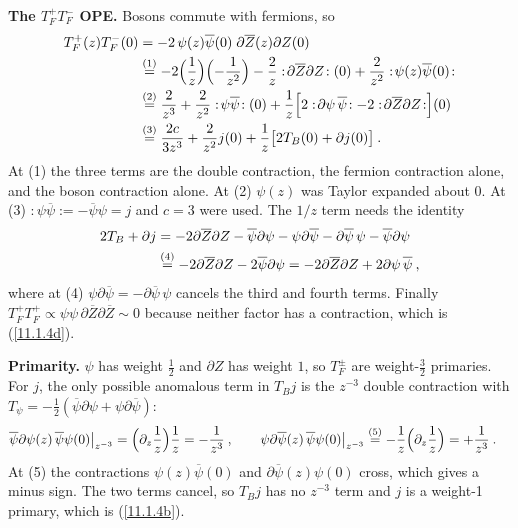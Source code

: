 \begin{tcolorbox}[breakable]
\begin{remark}
		\textbf{The $T_F^+T_F^-$ OPE.} Bosons commute with fermions, so
		\begin{align*}
			T_{F}^{+}(z)T_{F}^{-}(0)&=-2\,\psi(z)\overline{\psi}(0)\;\partial\overline{Z}(z)\partial Z(0)\\
			&\eqs{1}-2\Bigl(\frac{1}{z}\Bigr)\Bigl(-\frac{1}{z^{2}}\Bigr)-\frac{2}{z}:\!\partial\overline{Z}\partial Z\!:(0)+\frac{2}{z^{2}}:\!\psi(z)\overline{\psi}(0)\!:\\
			&\eqs{2}\frac{2}{z^{3}}+\frac{2}{z^{2}}:\!\psi\overline{\psi}\!:(0)+\frac{1}{z}\Bigl[2:\!\partial\psi\,\overline{\psi}\!:-2:\!\partial\overline{Z}\partial Z\!:\Bigr](0)\\
			&\eqs{3}\frac{2c}{3z^{3}}+\frac{2}{z^{2}}j(0)+\frac{1}{z}\bigl[2T_{B}(0)+\partial j(0)\bigr]\:.
		\end{align*}
		At (1) the three terms are the double contraction, the fermion contraction alone, and the boson contraction alone. At (2) $\psi(z)$ was Taylor expanded about $0$. At (3) $:\!\psi\overline{\psi}\!:=-\overline{\psi}\psi=j$ and $c=3$ were used. The $1/z$ term needs the identity
		\begin{align*}
			2T_{B}+\partial j&=-2\partial\overline{Z}\partial Z-\overline{\psi}\partial\psi-\psi\partial\overline{\psi}-\partial\overline{\psi}\,\psi-\overline{\psi}\partial\psi\\
			&\overset{(4)}{=}-2\partial\overline{Z}\partial Z-2\overline{\psi}\partial\psi
			=-2\partial\overline{Z}\partial Z+2\partial\psi\,\overline{\psi}\:,
		\end{align*}
		where at (4) $\psi\partial\overline{\psi}=-\partial\overline{\psi}\,\psi$ cancels the third and fourth terms. Finally $T_{F}^{+}T_{F}^{+}\propto\psi\psi\,\partial\overline{Z}\partial\overline{Z}\sim0$ because neither factor has a contraction, which is (\ref{11.1.4d}).

		\textbf{Primarity.} $\psi$ has weight $\frac12$ and $\partial Z$ has weight $1$, so $T_{F}^{\pm}$ are weight-$\frac{3}{2}$ primaries. For $j$, the only possible anomalous term in $T_{B}j$ is the $z^{-3}$ double contraction with $T_{\psi}=-\frac{1}{2}(\overline{\psi}\partial\psi+\psi\partial\overline{\psi})$:
		\begin{align*}
			\overline{\psi}\partial\psi(z)\,\overline{\psi}\psi(0)\big|_{z^{-3}}&=\Bigl(\partial_{z}\frac{1}{z}\Bigr)\frac{1}{z}=-\frac{1}{z^{3}}\:,\qquad
			\psi\partial\overline{\psi}(z)\,\overline{\psi}\psi(0)\big|_{z^{-3}}\overset{(5)}{=}-\frac{1}{z}\Bigl(\partial_{z}\frac{1}{z}\Bigr)=+\frac{1}{z^{3}}\:.
		\end{align*}
		At (5) the contractions $\psi(z)\overline{\psi}(0)$ and $\partial\overline{\psi}(z)\psi(0)$ cross, which gives a minus sign. The two terms cancel, so $T_{B}j$ has no $z^{-3}$ term and $j$ is a weight-1 primary, which is (\ref{11.1.4b}).
	\end{remark}
\end{tcolorbox}

